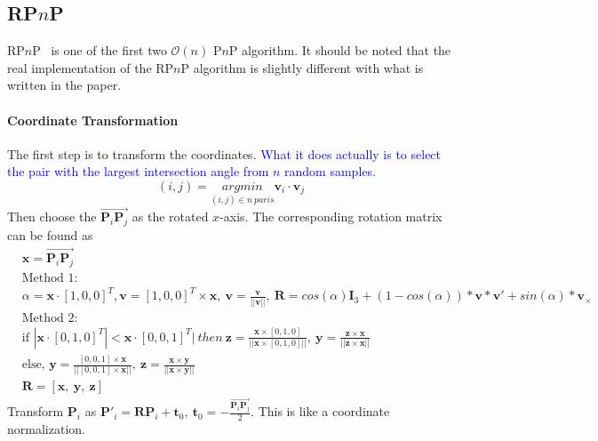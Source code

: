 \documentclass[a4paper]{article}
\begin{document}
\subsection{RP$n$P}
RP$n$P~\cite{li2012robust} is one of the first two $\mathcal{O}(n)$ P$n$P algorithm. It should be noted that the real implementation of the RP$n$P algorithm is slightly different with what is written in the paper. 
\paragraph{Coordinate Transformation}
The first step is to transform the coordinates. \textcolor{blue}{What it does actually is to select the pair with the largest intersection angle from $n$ random samples.}
$$
(i,j)=\underset{(i,j) \in n\ paris}{argmin}{\mathbf{v}_i \cdot \mathbf{v}_j}
$$
Then choose the $\overrightarrow{\mathbf{P}_i\mathbf{P}_j}$ as the rotated $x$-axis. The corresponding rotation matrix can be found as
\begin{align*}
&\mathbf{x} = \overrightarrow{\mathbf{P}_i\mathbf{P}_j} \\
&\text{Method 1}:\\
&\alpha = \mathbf{x} \cdot [1,0,0]^T, \mathbf{v} = [1,0,0]^T \times \mathbf{x},\ \mathbf{v} = \frac{\mathbf{v}}{||\mathbf{v}||},\ \mathbf{R}=cos(\alpha)\mathbf{I}_3 + (1 - cos(\alpha)) * \mathbf{v} * \mathbf{v}' + sin(\alpha) * \mathbf{v}_{\times} \\
&\text{Method 2}:\\
&\text{if } |\mathbf{x} \cdot [0,1,0]^T| < \mathbf{x} \cdot [0,0,1]^T|\ then\  \mathbf{z} = \frac{\mathbf{x} \times [0,1,0]}{||\mathbf{x} \times [0,1,0]||},\ \mathbf{y}=\frac{\mathbf{z} \times \mathbf{x}}{||\mathbf{z} \times \mathbf{x}||} \\
& \text{else, } \mathbf{y} = \frac{[0,0,1] \times \mathbf{x}}{||[0,0,1] \times \mathbf{x}||},\ \mathbf{z}=\frac{\mathbf{x} \times \mathbf{y}}{||\mathbf{x} \times \mathbf{y}||} \\
&\mathbf{R}=[\mathbf{x},\ \mathbf{y},\ \mathbf{z}]
\end{align*}
Transform $\mathbf{P}_i$ as $\mathbf{P}'_i = \mathbf{RP}_i+\mathbf{t}_0,\ \mathbf{t}_0=-\frac{\overrightarrow{\mathbf{P}_i\mathbf{P}_j}}{2}$. This is like a coordinate normalization.
\end{document}
